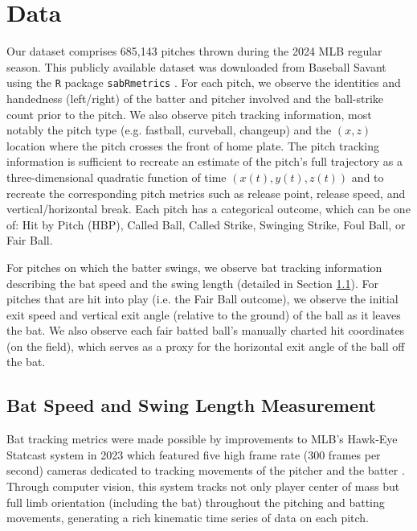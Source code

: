 \documentclass[
  12pt]{article}
\begin{document}
  \section{Data}
  \label{sec:data}

    Our dataset comprises 685,143 pitches thrown during the 2024 MLB regular season. This publicly available dataset was downloaded from Baseball Savant \citep{mlb_advanced_media_statcast_2024} using the \texttt{R} package \texttt{sabRmetrics} \citep{powers_sabrmetrics_2025}. For each pitch, we observe the identities and handedness (left/right) of the batter and pitcher involved and the ball-strike count prior to the pitch. We also observe pitch tracking information, most notably the pitch type (e.g. fastball, curveball, changeup) and the $(x, z)$ location where the pitch crosses the front of home plate. The pitch tracking information is sufficient to recreate an estimate of the pitch's full trajectory as a three-dimensional quadratic function of time $(x(t), y(t), z(t))$ and to recreate the corresponding pitch metrics such as release point, release speed, and vertical/horizontal break. Each pitch has a categorical outcome, which can be one of: Hit by Pitch (HBP), Called Ball, Called Strike, Swinging Strike, Foul Ball, or Fair Ball.

    For pitches on which the batter swings, we observe bat tracking information describing the bat speed and the swing length (detailed in Section \ref{sec:measurement}). For pitches that are hit into play (i.e. the Fair Ball outcome), we observe the initial exit speed and vertical exit angle (relative to the ground) of the ball as it leaves the bat. We also observe each fair batted ball's manually charted hit coordinates (on the field), which serves as a proxy for the horizontal exit angle of the ball off the bat.

    \subsection{Bat Speed and Swing Length Measurement}
    \label{sec:measurement}

      Bat tracking metrics were made possible by improvements to MLB's Hawk-Eye Statcast system in 2023 which featured five high frame rate (300 frames per second) cameras dedicated to tracking movements of the pitcher and the batter \citep{goldbeck_introducing_2023}. Through computer vision, this system tracks not only player center of mass but full limb orientation (including the bat) throughout the pitching and batting movements, generating a rich kinematic time series of data on each pitch.
\end{document}
